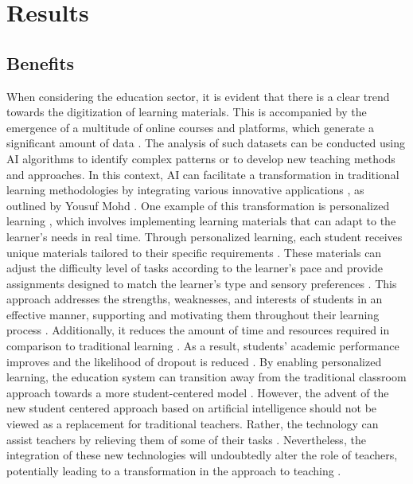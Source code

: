 \documentclass[]{lni}
\begin{document}
\section{Results}
%
\subsection{Benefits}
%
When considering the education sector, it is evident that there is a clear trend towards the digitization of learning materials. 
This is accompanied by the emergence of a multitude of online courses and platforms, which generate a significant amount of data \cite{Lin2023}. The analysis of 
such datasets can be conducted using AI algorithms to identify complex patterns or to develop new teaching methods and approaches.
%
In this context, AI can facilitate a transformation in traditional learning methodologies by integrating various innovative applications \cite{Judijanto2022}, 
as outlined by Yousuf Mohd \cite{9670009}. 
%
One example of this transformation is personalized learning \cite{shemshack2020systematic}, which involves implementing learning materials that can adapt 
to the learner's needs in real time. Through personalized learning, each student receives unique materials tailored to their specific requirements \cite{9670009}. 
These materials can adjust the difficulty level of tasks according to the learner's pace and provide assignments designed to match the learner's type and sensory 
preferences \cite{9457948} \cite{7742268}. This approach addresses the strengths, weaknesses, and interests of students in an effective manner, supporting and motivating them throughout their learning 
process \cite{shemshack2020systematic}. Additionally, it reduces the amount of time and resources required in comparison to traditional learning \cite{Lin2023}.
As a result, students' academic performance improves \cite{shemshack2020systematic} \cite{9457948} and the likelihood of dropout is reduced \cite{9368432}.
By enabling personalized learning, the education system can transition away from the traditional classroom approach towards a more student-centered model \cite{Lin2023}.
%
%
However, the advent of the new student centered approach based on artificial intelligence should not be viewed as a replacement for traditional teachers. Rather, 
the technology can assist teachers by relieving them of some of their tasks \cite{7742268} \cite{Lin2023} \cite{Tanveer2020}. Nevertheless, the integration of 
these new technologies will undoubtedly alter the role of teachers, potentially leading to a transformation in the approach to teaching \cite{Lin2023} \cite{9670009}.  
\end{document}
